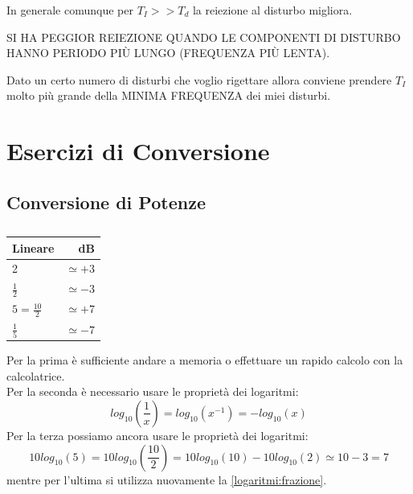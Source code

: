 \documentclass[a4paper,11pt]{report}
\begin{document}
In generale comunque per $ T_I >> T_d $ la reiezione al disturbo migliora.

SI HA PEGGIOR REIEZIONE QUANDO LE COMPONENTI DI DISTURBO HANNO PERIODO PIÙ LUNGO (FREQUENZA PIÙ LENTA).

Dato un certo numero di disturbi che voglio rigettare allora conviene prendere $ T_I $ molto più grande della MINIMA FREQUENZA dei miei disturbi.
\chapter{Esercizi di Conversione}
\label{esercizi:conversione}
\section{Conversione di Potenze}
\begin{table}[H]
  \caption{}
  \label{tab:}

  \begin{center}
    \begin{tabular}{|l|r|}
    \hline
    Lineare                 & dB\\
    \hline
       2                    & $\simeq +3$ \\
    \hline
       $\frac{1}{2}$        & $\simeq -3$ \\
    \hline
       $5 = \frac{10}{2}$   & $\simeq +7$ \\
    \hline
       $\frac{1}{5}$        & $\simeq -7$ \\
    \hline
    \end{tabular}
  \end{center}
\end{table}
Per la prima è sufficiente andare a memoria o effettuare un rapido calcolo con la calcolatrice.\\
Per la seconda è necessario usare le proprietà dei logaritmi:
\begin{equation}
  \label{logaritmi:frazione}
  log_{10}(\frac{1}{x}) = log_{10}(x^{-1}) = -log_{10}(x)  
\end{equation}
Per la terza possiamo ancora usare le proprietà dei logaritmi:
\begin{equation}
  \label{logaritmi:differenza}
  10log_{10}(5) = 10log_{10}(\frac{10}{2}) = 10log_{10}(10)-10log_{10}(2) \simeq 10 - 3 = 7  
\end{equation}
mentre per l'ultima si utilizza nuovamente la \ref{logaritmi:frazione}.
\end{document}
